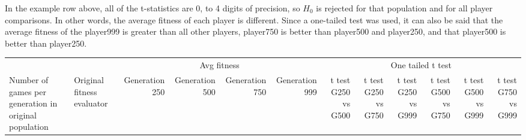 \begin{landscape}
In the example row above, all of the t-statistics are 0, to 4 digits of
precision, so $H_{0}$ is rejected for that population and for all player
comparisons. In other words, the average fitness of each player is different.
Since a one-tailed test was used, it can also be said that the average fitness
of the player999 is greater than all other players, player750 is better than
player500 and player250, and that player500 is better than player250.

\begin{table}[ht]
  \centering
    \begin{tabularx}{\linewidth}{|p{1in}|p{1in}|r|r|r|r|r|r|r|r|r|r|}
\cline{3-12}    \multicolumn{1}{l}{} &  & \multicolumn{4}{c|}{Avg fitness} & \multicolumn{6}{c|}{One tailed t test} \\ \cline{1-12}
    Number of games per generation in original population
    & Original fitness evaluator 
    & \multicolumn{1}{p{0.7in}|}{Generation 250} 
    & \multicolumn{1}{p{0.7in}|}{Generation 500}
    & \multicolumn{1}{p{0.7in}|}{Generation 750}
    & \multicolumn{1}{p{0.7in}|}{Generation 999}
    & \multicolumn{1}{X|}{t test G250 vs G500} 
    & \multicolumn{1}{X|}{t test G250 vs G750}
    & \multicolumn{1}{X|}{t test G250 vs G999}
    & \multicolumn{1}{X|}{t test G500 vs G750}
    & \multicolumn{1}{X|}{t test G500 vs G999}
    & \multicolumn{1}{X|}{t test G750 vs G999} \\ \cline{1-12}


\end{tabularx}
\end{table}
\end{landscape}
